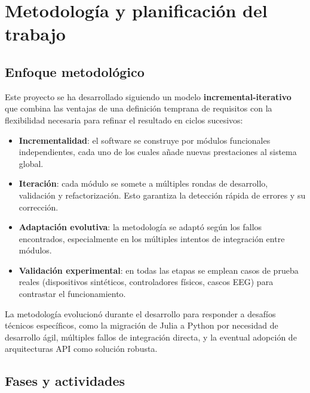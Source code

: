 \chapter{Metodología y planificación del trabajo}
\label{chap:metodologia}

\section{Enfoque metodológico}

Este proyecto se ha desarrollado siguiendo un modelo \textbf{incremental-iterativo} que combina las ventajas de una definición temprana de requisitos con la flexibilidad necesaria para refinar el resultado en ciclos sucesivos:

\begin{itemize}
    \item \textbf{Incrementalidad}: el software se construye por módulos funcionales independientes, cada uno de los cuales añade nuevas prestaciones al sistema global.
    
    \item \textbf{Iteración}: cada módulo se somete a múltiples rondas de desarrollo, validación y refactorización. Esto garantiza la detección rápida de errores y su corrección.
    
    \item \textbf{Adaptación evolutiva}: la metodología se adaptó según los fallos encontrados, especialmente en los múltiples intentos de integración entre módulos.
    
    \item \textbf{Validación experimental}: en todas las etapas se emplean casos de prueba reales (dispositivos sintéticos, controladores físicos, cascos EEG) para contrastar el funcionamiento.
\end{itemize}

La metodología evolucionó durante el desarrollo para responder a desafíos técnicos específicos, como la migración de Julia a Python por necesidad de desarrollo ágil, múltiples fallos de integración directa, y la eventual adopción de arquitecturas API como solución robusta.

\section{Fases y actividades}

